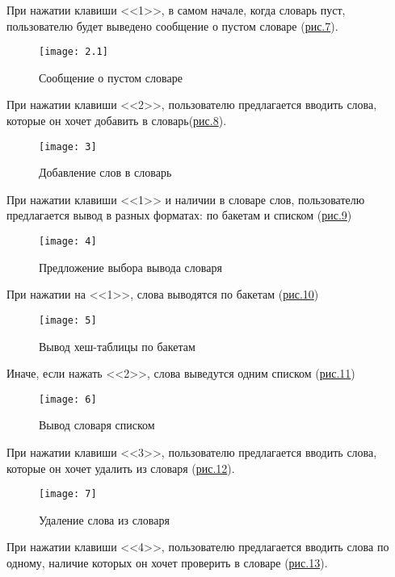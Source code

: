 \documentclass[10pt,a4paper,final]{article} %
\begin{document}
При нажатии клавиши <<1>>, в самом начале, когда словарь пуст, пользователю будет выведено сообщение о пустом словаре (\hyperref[fig:2.2]{рис.7}).

\begin{figure}[htbp]
	\centering
	\texttt{[image: 2.1]}
	\caption{Сообщение о пустом словаре}
	\label{fig:2.1}
\end{figure}

\newpage
При нажатии клавиши <<2>>, пользователю предлагается вводить слова, которые он хочет добавить в словарь(\hyperref[fig:3]{рис.8}).

\begin{figure}[htbp]
	\centering
	\texttt{[image: 3]}
	\caption{Добавление слов в словарь}
	\label{fig:3}
\end{figure}

При нажатии клавиши <<1>> и наличии в словаре слов, пользователю предлагается вывод в разных форматах: по бакетам и списком (\hyperref[fig:4]{рис.9})

\begin{figure}[htbp]
	\centering
	\texttt{[image: 4]}
	\caption{Предложение выбора вывода словаря}
	\label{fig:4}
\end{figure}

При нажатии на <<1>>, слова выводятся по бакетам (\hyperref[fig:5]{рис.10})

\begin{figure}[htbp]
	\centering
	\texttt{[image: 5]}
	\caption{Вывод хеш-таблицы по бакетам}
	\label{fig:5}
\end{figure}

\newpage
Иначе, если нажать <<2>>, слова выведутся одним списком (\hyperref[fig:6]{рис.11})

\begin{figure}[htbp]
	\centering
	\texttt{[image: 6]}
	\caption{Вывод словаря списком}
	\label{fig:6}
\end{figure}


При нажатии клавиши <<3>>, пользователю предлагается вводить слова, которые он хочет удалить из словаря (\hyperref[fig:7]{рис.12}).

\begin{figure}[htbp]
	\centering
	\texttt{[image: 7]}
	\caption{Удаление слова из словаря}
	\label{fig:7}
\end{figure}

При нажатии клавиши <<4>>, пользователю предлагается вводить слова по одному, наличие которых он хочет проверить в словаре (\hyperref[fig:8]{рис.13}).
\end{document}
